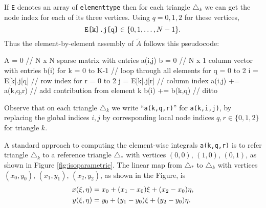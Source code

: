 If \texttt{E} denotes an array of \texttt{elementtype} then for each triangle $\triangle_k$ we can get the node index for each of its three vertices.  Using $q=0,1,2$ for these vertices,
    $$\text{\texttt{E[k].j[q]}} \in \{0,1,\dots,N-1\}.$$
Thus the element-by-element assembly of $\tilde A$ follows this pseudocode:
\begin{code}
A = 0                           // N x N sparse matrix with entries a(i,j)
b = 0                           // N x 1 column vector with entries b(i)
for k = 0 to K-1                // loop through all elements
    for q = 0 to 2
        i = E[k].j[q]           // row index
        for r = 0 to 2
            j = E[k].j[r]       // column index
            a(i,j) += a(k,q,r)  // add contribution from element k
            b(i)   += b(k,q)    // ditto
\end{code}
\medskip\noindent
Observe that on each triangle $\triangle_k$ we write ``\texttt{a(k,q,r)}'' for \texttt{a(k,i,j)}, by replacing the global indices $i,j$ by corresponding local node indices $q,r\in\{0,1,2\}$ for triangle $k$.

A standard approach to computing the element-wise integrals \texttt{a(k,q,r)} is to refer triangle $\triangle_k$ to a reference triangle $\triangle_\ast$ with vertices $(0,0),\,(1,0),\,(0,1)$, as shown in Figure \ref{fig:isoparametric}.  The linear map from $\triangle_\ast$ to $\triangle_k$ with vertices $(x_0,y_0),\,(x_1,y_1),\,(x_2,y_2)$, as shown in the Figure, is
\begin{align}
x(\xi,\eta) &= x_0 + (x_1-x_0) \xi + (x_2-x_0) \eta, \label{trianglemap} \\
y(\xi,\eta) &= y_0 + (y_1-y_0) \xi + (y_2-y_0) \eta. \notag
\end{align}

